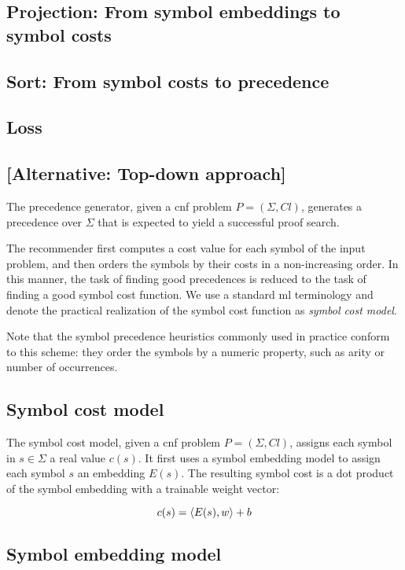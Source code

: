 \subsection{Projection: From symbol embeddings to symbol costs}

\subsection{Sort: From symbol costs to precedence}

\subsection{Loss}

\subsection{[Alternative: Top-down approach]}

The precedence generator, given a \gls{cnf} problem $P = (\Sigma, \mathit{Cl})$,
generates a precedence over $\Sigma$
that is expected to yield a successful proof search.

The recommender first computes a cost value for each symbol of the input problem,
and then orders the symbols by their costs in a non-increasing order.
In this manner, the task of finding good precedences is reduced to the task
of finding a good symbol cost function.
We use a standard \gls{ml} terminology and denote
the practical realization of the symbol cost function as \emph{symbol cost model}.

Note that the symbol precedence heuristics commonly used in practice
conform to this scheme:
they order the symbols by a numeric property, such as arity or number of occurrences.

\subsection{Symbol cost model}

The symbol cost model, given a \gls{cnf} problem $P = (\Sigma, \mathit{Cl})$,
assigns each symbol in $s \in \Sigma$ a real value $c(s)$.
It first uses a symbol embedding model to assign each symbol $s$ an embedding $E(s)$.
The resulting symbol cost is a dot product of the symbol embedding with a trainable weight vector:

$$
c(s) = \left<E(s),w\right> + b
$$

\subsection{Symbol embedding model}

